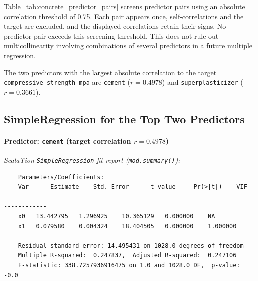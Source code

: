 Table~\ref{tab:concrete_predictor_pairs} screens predictor pairs using an absolute correlation threshold of 0.75. Each pair appears once, self-correlations and the target are excluded, and the displayed correlations retain their signs. No predictor pair exceeds this screening threshold. This does not rule out multicollinearity involving combinations of several predictors in a future multiple regression.

The two predictors with the largest absolute correlation to the target \texttt{compressive\_strength\_mpa} are \texttt{cement} ($r=0.4978$) and \texttt{superplasticizer} ($r=0.3661$).

\subsection{SimpleRegression for the Top Two Predictors}

\paragraph{Predictor: \texttt{cement} (target correlation $r = 0.4978$)}

\textit{ScalaTion \texttt{SimpleRegression} fit report (\texttt{mod.summary()}):}
\begin{verbatim}
    Parameters/Coefficients:
    Var      Estimate    Std. Error 	 t value 	 Pr(>|t|) 	 VIF
----------------------------------------------------------------------------------
    x0	 13.442795	 1.296925	 10.365129	 0.000000	 NA
    x1	 0.079580	 0.004324	 18.404505	 0.000000	 1.000000

    Residual standard error: 14.495431 on 1028.0 degrees of freedom
    Multiple R-squared:  0.247837,	Adjusted R-squared:  0.247106
    F-statistic: 338.7257936916475 on 1.0 and 1028.0 DF,  p-value: -0.0
\end{verbatim}

